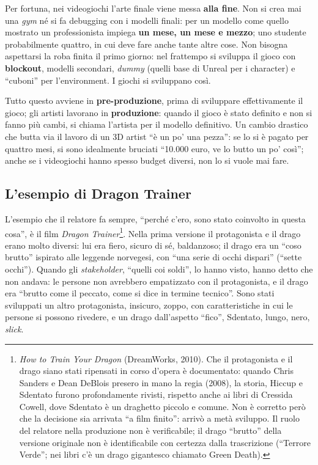 Per fortuna, nei videogiochi l'arte finale viene messa \textbf{alla fine}. Non
si crea mai una \emph{gym} né si fa debugging con i modelli finali: per un
modello come quello mostrato un professionista impiega \textbf{un mese, un
mese e mezzo}; uno studente probabilmente quattro, in cui deve fare anche tante
altre cose. Non bisogna aspettarsi la roba finita il primo giorno: nel
frattempo si sviluppa il gioco con \textbf{blockout}, modelli secondari,
\emph{dummy} (quelli base di Unreal per i character) e ``cuboni'' per
l'environment. I giochi si sviluppano così.

Tutto questo avviene in \textbf{pre-produzione}, prima di sviluppare
effettivamente il gioco; gli artisti lavorano in \textbf{produzione}: quando
il gioco è stato definito e non si fanno più cambi, si chiama l'artista per il
modello definitivo. Un cambio drastico che butta via il lavoro di un 3D artist
``è un po' una pezza'': se lo si è pagato per quattro mesi, si sono idealmente
bruciati ``10.000 euro, ve lo butto un po' così''; anche se i videogiochi hanno
spesso budget diversi, non lo si vuole mai fare.

\subsection{L'esempio di Dragon Trainer}

L'esempio che il relatore fa sempre, ``perché c'ero, sono stato coinvolto in
questa cosa'', è il film \emph{Dragon Trainer}\footnote{\emph{How to Train
Your Dragon} (DreamWorks, 2010). Che il protagonista e il drago siano stati
ripensati in corso d'opera è documentato: quando Chris Sanders e Dean DeBlois
presero in mano la regia (2008), la storia, Hiccup e Sdentato furono
profondamente rivisti, rispetto anche ai libri di Cressida Cowell, dove
Sdentato è un draghetto piccolo e comune. Non è corretto però che la decisione
sia arrivata ``a film finito'': arrivò a metà sviluppo. Il ruolo del relatore
nella produzione non è verificabile; il drago ``brutto'' della versione
originale non è identificabile con certezza dalla trascrizione (``Terrore
Verde''; nei libri c'è un drago gigantesco chiamato Green Death).}. Nella prima
versione il protagonista e il drago erano molto diversi: lui era fiero, sicuro
di sé, baldanzoso; il drago era un ``coso brutto'' ispirato alle leggende
norvegesi, con ``una serie di occhi dispari'' (``sette occhi''). Quando gli
\emph{stakeholder}, ``quelli coi soldi'', lo hanno visto, hanno detto che non
andava: le persone non avrebbero empatizzato con il protagonista, e il drago
era ``brutto come il peccato, come si dice in termine tecnico''. Sono stati
sviluppati un altro protagonista, insicuro, zoppo, con caratteristiche in cui
le persone si possono rivedere, e un drago dall'aspetto ``fico'', Sdentato,
lungo, nero, \emph{slick}.

